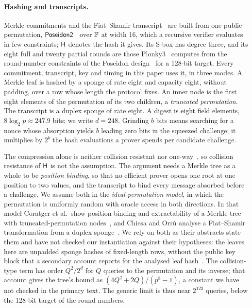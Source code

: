 \paragraph{Hashing and transcripts.} Merkle commitments and the Fiat--Shamir transcript~\citep{fiat-shamir} are built from one public permutation, $\mathsf{Poseidon2}{}$~\citep{poseidon2} over $\mathbb{F}$ at width 16, which a recursive verifier evaluates in few constraints; $\mathsf{H}$ denotes the hash it gives. Its S-box has degree three, and its eight full and twenty partial rounds are those Plonky3~\citep{plonky3} computes from the round-number constraints of the Poseidon design~\citep{poseidon} for a 128-bit target. Every commitment, transcript, key and timing in this paper uses it, in three modes. A Merkle leaf is hashed by a sponge of rate eight and capacity eight, without padding, over a row whose length the protocol fixes. An inner node is the first eight elements of the permutation of its two children, a \emph{truncated permutation}. The transcript is a duplex sponge of rate eight. A digest is eight field elements, $8 \log_2 p \approx 247.9$ bits; we write $d = 248$. Grinding $b$ bits means searching for a nonce whose absorption yields $b$ leading zero bits in the squeezed challenge; it multiplies by $2^{b}$ the hash evaluations a prover spends per candidate challenge.

The compression alone is neither collision resistant nor one-way~\citep{ckmw26}, so collision resistance of $\mathsf{H}$ is not the assumption. The argument needs a Merkle tree as a whole to be \emph{position binding}, so that no efficient prover opens one root at one position to two values, and the transcript to bind every message absorbed before a challenge. We assume both in the \emph{ideal-permutation model}, in which the permutation is uniformly random with oracle access in both directions. In that model Coratger et al.\ show position binding and extractability of a Merkle tree with truncated-permutation nodes~\citep{ckmw26}, and Chiesa and Orr\`u analyse a Fiat--Shamir transformation from a duplex sponge~\citep{chiesa-orru25}. We rely on both as their abstracts state them and have not checked our instantiation against their hypotheses: the leaves here are unpadded sponge hashes of fixed-length rows, without the public key block that a secondary account reports for the analysed leaf hash~\citep[\S6]{kim26}. The collision-type term has order $Q^2/2^{d}$ for $Q$ queries to the permutation and its inverse; that account gives the tree's bound as $(4Q^2 + 2Q)/(p^8 - 1)$, a constant we have not checked in the primary text. The generic limit is thus near $2^{123}$ queries, below the 128-bit target of the round numbers.

